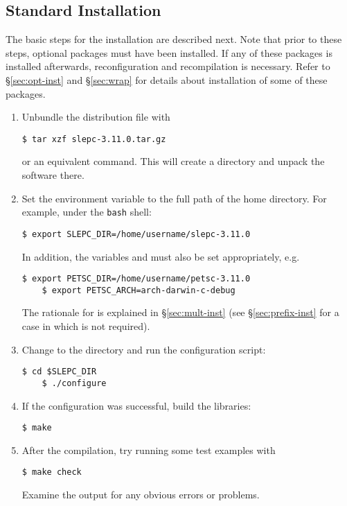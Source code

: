\subsection{Standard Installation}
\label{sec:std-inst}

	The basic steps for the installation are described next. Note that prior to these steps, optional packages must have been installed. If any of these packages is installed afterwards, reconfiguration and recompilation is necessary. Refer to \S\ref{sec:opt-inst} and \S\ref{sec:wrap} for details about installation of some of these packages.

\begin{enumerate}
	\item Unbundle the distribution file with
	\begin{Verbatim}[fontsize=\small]
	$ tar xzf slepc-3.11.0.tar.gz
	\end{Verbatim}
        or an equivalent command. This will create a directory and unpack the software there.
	\item Set the environment variable  to the full path of the \slepc home directory. For example, under the \texttt{bash} shell:
	\begin{Verbatim}[fontsize=\small]
	$ export SLEPC_DIR=/home/username/slepc-3.11.0
	\end{Verbatim}
	In addition, the variables  and  must also be set appropriately, e.g.
	\begin{Verbatim}[fontsize=\small]
	$ export PETSC_DIR=/home/username/petsc-3.11.0
	$ export PETSC_ARCH=arch-darwin-c-debug
	\end{Verbatim}
        The rationale for  is explained in \S\ref{sec:mult-inst} (see \S\ref{sec:prefix-inst} for a case in which  is not required).
	\item\label{step-config} Change to the \slepc directory and run the configuration script:
	\begin{Verbatim}[fontsize=\small]
	$ cd $SLEPC_DIR
	$ ./configure
	\end{Verbatim}
	\item If the configuration was successful, build the libraries:
	\begin{Verbatim}[fontsize=\small]
	$ make
	\end{Verbatim}
	\item After the compilation, try running some test examples with
	\begin{Verbatim}[fontsize=\small]
	$ make check
	\end{Verbatim}
        Examine the output for any obvious errors or problems.
\end{enumerate}
	
